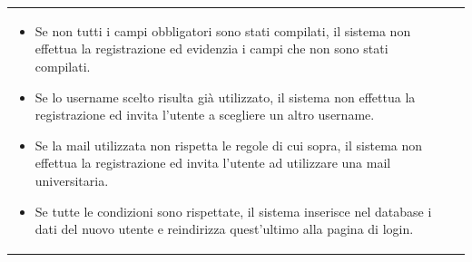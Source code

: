 \documentclass[10pt,a4paper]{article}
\begin{document}
\begin{tabular}{lp{}}
\begin{enumerate}
			\begin{itemize}
				\item Se non tutti i campi obbligatori sono stati compilati, il sistema non effettua la registrazione ed evidenzia i campi che non sono stati compilati.
				\item Se lo username scelto risulta già utilizzato, il sistema non effettua la registrazione ed invita l'utente a scegliere un altro username.
				\item Se la mail utilizzata non rispetta le regole di cui sopra, il sistema non effettua la registrazione ed invita l'utente ad utilizzare una mail universitaria.
				\item Se tutte le condizioni sono rispettate, il sistema inserisce nel database i dati del nuovo utente e reindirizza quest'ultimo alla pagina di login.
			\end{itemize}
		\end{enumerate}
	\end{tabular}
	
\end{document}
